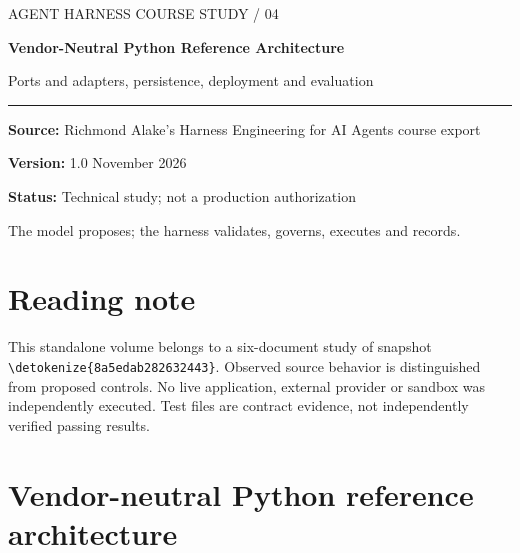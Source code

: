\documentclass[11pt,letterpaper]{article}
\newcommand{\src}[1]{\expandafter\nolinkurl\expandafter{\detokenize{#1}}}
\begin{document}
\begin{titlepage}
\vspace*{1.25in}
{\color{teal}\large AGENT HARNESS COURSE STUDY / 04\par}\vspace{.3in}
{\color{navy}\Huge\bfseries Vendor-Neutral Python Reference Architecture\par}\vspace{.18in}
{\Large Ports and adapters, persistence, deployment and evaluation\par}\vspace{.5in}
\rule{\linewidth}{1pt}\par
\textbf{Source:} Richmond Alake's Harness Engineering for AI Agents course export\par
\textbf{Version:} 1.0  November 2026\par
\textbf{Status:} Technical study; not a production authorization\par
\vfill
The model proposes; the harness validates, governs, executes and records.
\end{titlepage}
\tableofcontents\clearpage
\section*{Reading note}
This standalone volume belongs to a six-document study of snapshot \src{8a5edab282632443}. Observed source behavior is distinguished from proposed controls. No live application, external provider or sandbox was independently executed. Test files are contract evidence, not independently verified passing results.

\section{Vendor-neutral Python reference architecture}
\end{document}

